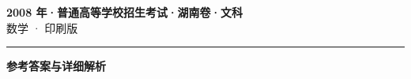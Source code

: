 \documentclass[zihao=5, a4paper]{ctexart}
\begin{document}
\begin{center}
  {\Large\bfseries 2008 年·普通高等学校招生考试·湖南卷·文科}\\[4pt]
  {\large 数学 · 印刷版}
\end{center}
\medskip
{}

\par\bigskip\hrule\bigskip
{}
\begin{center}{\large\bfseries 参考答案与详细解析}\end{center}
\smallskip

\end{document}
